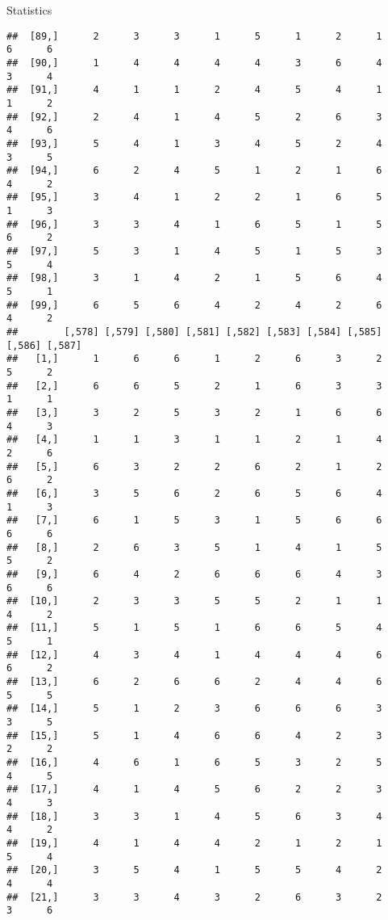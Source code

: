 \documentclass[
  ignorenonframetext,
]{beamer}
\begin{document}
\begin{frame}[fragile]{Statistics}
\begin{verbatim}
##  [89,]      2      3      3      1      5      1      2      1      6      6
##  [90,]      1      4      4      4      4      3      6      4      3      4
##  [91,]      4      1      1      2      4      5      4      1      1      2
##  [92,]      2      4      1      4      5      2      6      3      4      6
##  [93,]      5      4      1      3      4      5      2      4      3      5
##  [94,]      6      2      4      5      1      2      1      6      4      2
##  [95,]      3      4      1      2      2      1      6      5      1      3
##  [96,]      3      3      4      1      6      5      1      5      6      2
##  [97,]      5      3      1      4      5      1      5      3      5      4
##  [98,]      3      1      4      2      1      5      6      4      5      1
##  [99,]      6      5      6      4      2      4      2      6      4      2
##        [,578] [,579] [,580] [,581] [,582] [,583] [,584] [,585] [,586] [,587]
##   [1,]      1      6      6      1      2      6      3      2      5      2
##   [2,]      6      6      5      2      1      6      3      3      1      1
##   [3,]      3      2      5      3      2      1      6      6      4      3
##   [4,]      1      1      3      1      1      2      1      4      2      6
##   [5,]      6      3      2      2      6      2      1      2      6      2
##   [6,]      3      5      6      2      6      5      6      4      1      3
##   [7,]      6      1      5      3      1      5      6      6      6      6
##   [8,]      2      6      3      5      1      4      1      5      5      2
##   [9,]      6      4      2      6      6      6      4      3      6      6
##  [10,]      2      3      3      5      5      2      1      1      4      2
##  [11,]      5      1      5      1      6      6      5      4      5      1
##  [12,]      4      3      4      1      4      4      4      6      6      2
##  [13,]      6      2      6      6      2      4      4      6      5      5
##  [14,]      5      1      2      3      6      6      6      3      3      5
##  [15,]      5      1      4      6      6      4      2      3      2      2
##  [16,]      4      6      1      6      5      3      2      5      4      5
##  [17,]      4      1      4      5      6      2      2      3      4      3
##  [18,]      3      3      1      4      5      6      3      4      4      2
##  [19,]      4      1      4      4      2      1      2      1      5      4
##  [20,]      3      5      4      1      5      5      4      2      4      4
##  [21,]      3      3      4      3      2      6      3      2      3      6

\end{verbatim}
\end{frame}
\end{document}
